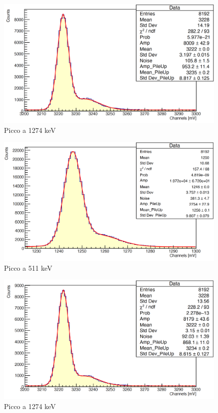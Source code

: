 \documentclass[a4paper,10pt]{article}
\begin{document}
\begin{figure}[H]
    \centering
    \includegraphics[scale=0.45]{appendice/spettri/NaPb2_21}
    \caption{Picco a 1274 keV}
\end{figure}
\begin{figure}[H]
    \centering
    \includegraphics[scale=0.45]{appendice/spettri/NaPb1_33}
    \caption{Picco a 511 keV}
\end{figure}
\begin{figure}[H]
    \centering
    \includegraphics[scale=0.45]{appendice/spettri/NaPb2_33}
    \caption{Picco a 1274 keV}
\end{figure}
\end{document}
